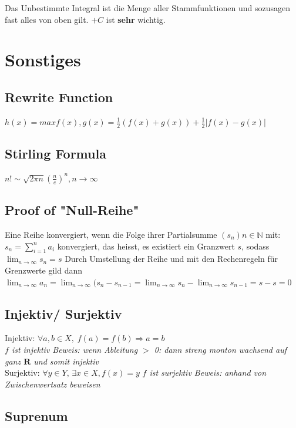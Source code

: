 \documentclass[8pt]{article}
\def\R{\mathbf{R}}
\begin{document}
\begin{multicols*}{3}
Das Unbestimmte Integral ist die Menge aller Stammfunktionen und sozusagen fast alles von oben gilt. $+C$ ist \textbf{sehr} wichtig.
\section{Sonstiges}
\subsection{Rewrite Function}
$h(x) = max{f(x), g(x)} = \frac{1}{2}(f(x) + g(x)) + \frac{1}{2}|f(x) -g(x)|$

\subsection{Stirling Formula}
$n! \sim \sqrt{2\pi n}(\frac{n}{e})^n, n \rightarrow \infty$

\subsection{Proof of "Null-Reihe"}
Eine Reihe konvergiert, wenn die Folge ihrer Partialsumme $(s_n) n \in \mathbb{N} $ mit: $s_n = \sum_{i=1}^{n} a_i$ konvergiert, das heisst, es existiert ein Granzwert $s$, sodass
	$\lim_{n \to \infty} s_n = s$  Durch Umstellung der Reihe und mit den Rechenregeln für Grenzwerte gild dann
	$\lim_{n \to \infty} a_n = \lim_{n \to \infty} (s_n - s_{n - 1} = \lim_{n \to \infty} s_n - \lim_{n \to \infty} s_{n-1} =  s - s = 0$

\hypertarget{sec:5}{}

\subsection{Injektiv/ Surjektiv}

Injektiv: $\forall a, b \in X, \;f(a) = f(b) \Rightarrow a = b$\\
\textit{$f$ ist injektiv Beweis: wenn Ableitung $>$ 0: dann streng monton wachsend auf ganz $\R$ und somit injektiv}\\
Surjektiv: $\forall y \in Y, \, \exists x \in X, f(x) = y$
\textit{$f$ ist surjektiv Beweis: anhand von Zwischenwertsatz beweisen}\\

\subsection{Suprenum}


\end{multicols*}
\end{document}
